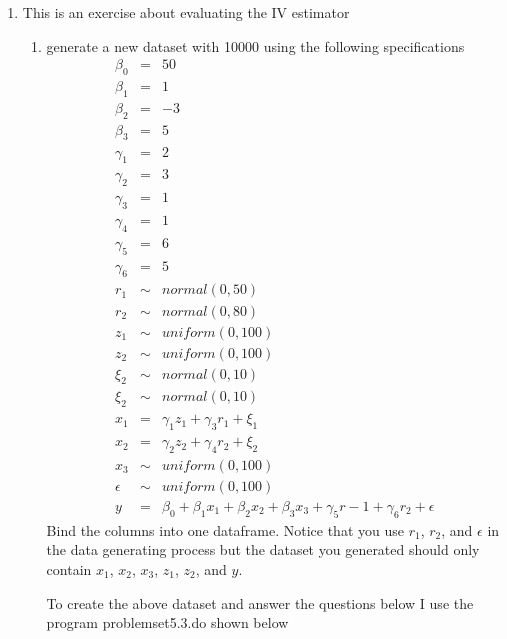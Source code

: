 \documentclass[11pt]{SelfArxOneColBMN}
\begin{document}
\begin{enumerate}
\begin{enumerate}
\begin{solution}
    \end{solution}
  \end{enumerate}
  \item This is an exercise about evaluating the IV estimator
  \begin{enumerate}
    \item generate a new dataset with 10000 using the following specifications
    \begin{eqnarray*}
      \beta_0 &=& 50\\
      \beta_1 &=& 1\\
      \beta_2 &=& -3\\
      \beta_3 &=& 5\\
      \gamma_1 &=& 2\\
      \gamma_2 &=& 3\\
      \gamma_3 &=& 1\\
      \gamma_4 &=& 1\\
      \gamma_5 &=& 6\\
      \gamma_6 &=& 5\\
      r_1 &\sim& normal(0,50)\\
      r_2 &\sim& normal(0,80)\\
      z_1 &\sim& uniform(0,100)\\
      z_2 &\sim& uniform(0,100)\\
      \xi_2 &\sim& normal(0,10)\\
      \xi_2 &\sim& normal(0,10)\\
      x_1 &=& \gamma_1z_1 + \gamma_3r_1 + \xi_1\\
      x_2 &=& \gamma_2z_2 + \gamma_4r_2 + \xi_2\\
      x_3 &\sim& uniform(0,100)\\
      \epsilon &\sim& uniform(0,100)\\
      y &=&  \beta_0 + \beta_1x_1 + \beta_2x_2 + \beta_3x_3 + \gamma_5r-1 + \gamma_6r_2 + \epsilon 
    \end{eqnarray*}
    Bind the columns into one dataframe. Notice that you use $r_1$, $r_2$, and $\epsilon$ in the data generating process but the dataset you generated should only contain $x_1$, $x_2$, $x_3$, $z_1$, $z_2$, and $y$.
    \begin{solution}
      To create the above dataset and answer the questions below I use the program problemset5.3.do shown below
      \singlespacing
      
      \onehalfspacing
    \end{solution}

\end{enumerate}
\end{enumerate}
\end{document}
